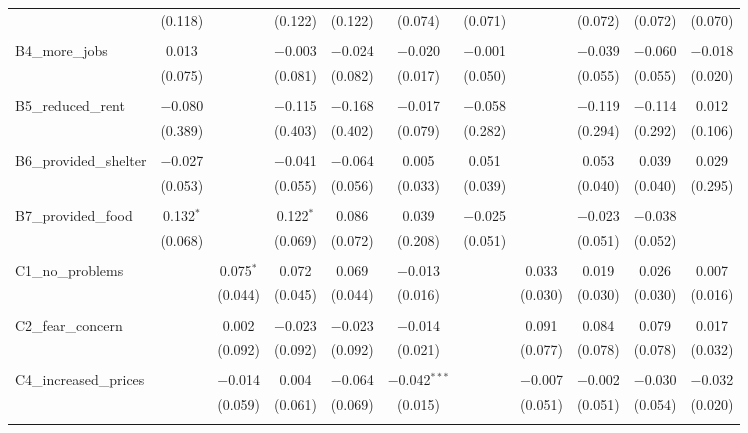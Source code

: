 \begin{table}[H]
\begin{tabular}{@{\extracolsep{4pt}}lcccccccccc}
  & (0.118) &  & (0.122) & (0.122) & (0.074) & (0.071) &  & (0.072) & (0.072) & (0.070) \\ 
  & & & & & & & & & & \\ 
 B4\_more\_jobs & 0.013 &  & $-$0.003 & $-$0.024 & $-$0.020 & $-$0.001 &  & $-$0.039 & $-$0.060 & $-$0.018 \\ 
  & (0.075) &  & (0.081) & (0.082) & (0.017) & (0.050) &  & (0.055) & (0.055) & (0.020) \\ 
  & & & & & & & & & & \\ 
 B5\_reduced\_rent & $-$0.080 &  & $-$0.115 & $-$0.168 & $-$0.017 & $-$0.058 &  & $-$0.119 & $-$0.114 & 0.012 \\ 
  & (0.389) &  & (0.403) & (0.402) & (0.079) & (0.282) &  & (0.294) & (0.292) & (0.106) \\ 
  & & & & & & & & & & \\ 
 B6\_provided\_shelter & $-$0.027 &  & $-$0.041 & $-$0.064 & 0.005 & 0.051 &  & 0.053 & 0.039 & 0.029 \\ 
  & (0.053) &  & (0.055) & (0.056) & (0.033) & (0.039) &  & (0.040) & (0.040) & (0.295) \\ 
  & & & & & & & & & & \\ 
 B7\_provided\_food & 0.132$^{*}$ &  & 0.122$^{*}$ & 0.086 & 0.039 & $-$0.025 &  & $-$0.023 & $-$0.038 &  \\ 
  & (0.068) &  & (0.069) & (0.072) & (0.208) & (0.051) &  & (0.051) & (0.052) &  \\ 
  & & & & & & & & & & \\ 
 C1\_no\_problems &  & 0.075$^{*}$ & 0.072 & 0.069 & $-$0.013 &  & 0.033 & 0.019 & 0.026 & 0.007 \\ 
  &  & (0.044) & (0.045) & (0.044) & (0.016) &  & (0.030) & (0.030) & (0.030) & (0.016) \\ 
  & & & & & & & & & & \\ 
 C2\_fear\_concern &  & 0.002 & $-$0.023 & $-$0.023 & $-$0.014 &  & 0.091 & 0.084 & 0.079 & 0.017 \\ 
  &  & (0.092) & (0.092) & (0.092) & (0.021) &  & (0.077) & (0.078) & (0.078) & (0.032) \\ 
  & & & & & & & & & & \\ 
 C4\_increased\_prices &  & $-$0.014 & 0.004 & $-$0.064 & $-$0.042$^{***}$ &  & $-$0.007 & $-$0.002 & $-$0.030 & $-$0.032 \\ 
  &  & (0.059) & (0.061) & (0.069) & (0.015) &  & (0.051) & (0.051) & (0.054) & (0.020) \\ 
  & & & & & & & & & & \\ 

\end{tabular}
\end{table}
